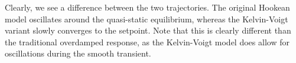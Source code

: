 \begin{example}
\begin{figure}[!t]
   \vspace{-0.1cm}
   \label{fig:C2:creep}
 \end{figure}
%
Clearly, we see a difference between the two trajectories. The original Hookean model oscillates around the quasi-static equilibrium, whereas the Kelvin-Voigt variant slowly converges to the setpoint. Note that this is clearly different than the traditional overdamped response, as the Kelvin-Voigt model does allow for oscillations during the smooth transient. %
%


\end{example}
